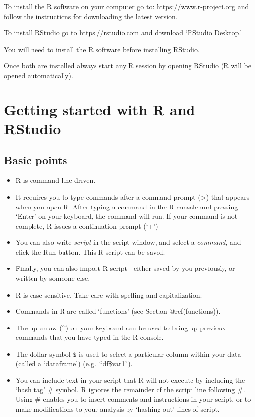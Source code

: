 \documentclass[
]{book}
\providecommand{\tightlist}{%
  \setlength{\itemsep}{0pt}\setlength{\parskip}{0pt}}
\begin{document}
To install the R software on your computer go to:
\url{https://www.r-project.org} and follow the instructions for
downloading the latest version.

To install RStudio go to \url{https://rstudio.com} and download `RStudio
Desktop.'

You will need to install the R software before installing RStudio.

Once both are installed always start any R session by opening RStudio (R
will be opened automatically).

\hypertarget{start}{%
\section{Getting started with R and RStudio}\label{start}}

\hypertarget{basic}{%
\subsection{Basic points}\label{basic}}

\begin{itemize}
\tightlist
\item
  R is command-line driven.
\item
  It requires you to type commands after a command prompt (\textgreater)
  that appears when you open R. After typing a command in the R console
  and pressing `Enter' on your keyboard, the command will run. If your
  command is not complete, R issues a continuation prompt (`+').
\item
  You can also write \emph{script} in the script window, and select a
  \emph{command}, and click the Run button. This R script can be saved.
\item
  Finally, you can also import R script - either saved by you
  previously, or written by someone else.
\item
  R is case sensitive. Take care with spelling and capitalization.
\item
  Commands in R are called `functions' (see Section @ref(functions)).
\item
  The up arrow (\^{}) on your keyboard can be used to bring up previous
  commands that you have typed in the R console.
\item
  The dollar symbol \texttt{\$} is used to select a particular column
  within your data (called a `dataframe') (e.g.~``df\$var1'').
\item
  You can include text in your script that R will not execute by
  including the `hash tag' \# symbol. R ignores the remainder of the
  script line following \#. Using \# enables you to insert comments and
  instructions in your script, or to make modifications to your analysis
  by `hashing out' lines of script.
\end{itemize}
\end{document}
